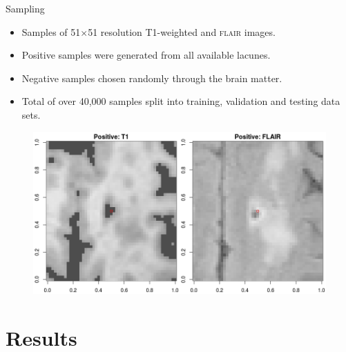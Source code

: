 \documentclass{beamer}
\begin{document}
\begin{frame}{Sampling}
\begin{itemize}
\item Samples of 51$\times$51 resolution T1-weighted and \textsc{flair} images.
\item Positive samples were generated from all available lacunes.
\item Negative samples chosen randomly through the brain matter.
\item Total of over 40,000 samples split into training, validation and testing data sets.
\end{itemize}
\begin{figure}
\centering
\includegraphics[scale=0.37]{../Thesis_Docs/Images/6_positive.png}
\end{figure}
\end{frame}


\section{Results}
\end{document}
